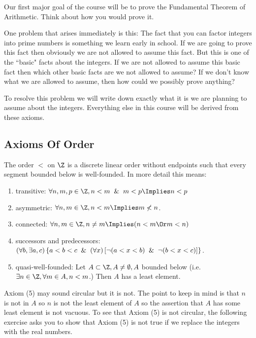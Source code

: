 \documentclass[oneside,12pt]{amsart}
\begin{document}
Our first major goal of the course will be to prove the Fundamental Theorem of Arithmetic. Think about how you would prove it.

One problem that arises immediately is this: The fact that you can factor integers into prime numbers is something we learn
early in school. If we are going to prove this fact then obviously we are not allowed to assume this fact. But this is
one of the ``basic" facts about the integers. If we are not allowed to assume this basic fact then which other basic facts
are we not allowed to assume? If we don't know what we are allowed to assume, then how could we possibly prove anything?

To resolve this problem we will write down exactly what it is we are planning to assume about the integers. Everything else in
this course will be derived from these axioms.

\subsection{Axioms Of Order}
The order $<$ on $\Z$ is a discrete linear order without endpoints such that every segment bounded below is well-founded.
In more detail this means:

\begin{enumerate}
\item transitive: $\forall n,m,p \in \Z, n < m \And m < p \Implies n < p$
\item asymmetric: $\forall n,m \in \Z, n < m \Implies m \not< n$.
\item connected: $\forall n,m \in \Z, n\not=m \Implies (n < m \Or m < n)$
\item successors and predecessors: \\
$(\forall b, \exists a,c) \left\{ a < b < c \And (\forall x )
\left [ \neg (a < x < b) \And \neg (b < x < c) \right] \right \}$.
\item quasi-well-founded: Let $A\subset \Z, A\not=\emptyset,A $
bounded below (i.e. $\exists n\in \Z, \forall m\in A, n < m$.) Then $A$ has a least element.
\end{enumerate}

Axiom (5) may sound circular but it is not. The point to keep in mind is that $n$ is not in $A$ so
$n$ is not the least element of $A$ so the assertion that $A$ has some least element is not vacuous.
To see that Axiom (5) is not circular, the following exercise asks you to show that Axiom (5) is not true
if we replace the integers with the real numbers.
\end{document}
